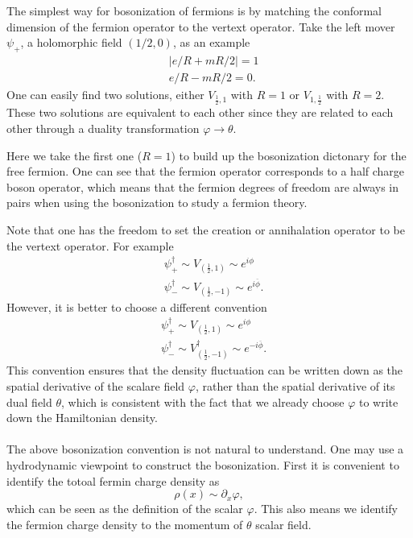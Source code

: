 The simplest way for bosonization of fermions is by matching the conformal dimension of the fermion operator to the vertext operator. Take the left mover $\psi_{+}$, a holomorphic field $\left(1/2,0\right)$, as an example
\begin{equation}
	\begin{aligned}
		&\left\vert e/R + mR/2 \right\vert = 1\\
		&e/R - mR/2 = 0.
	\end{aligned}
\end{equation}
One can easily find two solutions, either $V_{\frac{1}{2},1}$ with $R=1$ or $V_{1,\frac{1}{2}}$ with $R=2$. These two solutions are equivalent to each other since they are related to each other through a duality transformation $\varphi \rightarrow \theta$. 

Here we take the first one ($R=1$) to build up the bosonization dictonary for the free fermion. One can see that the fermion operator corresponds to a half charge boson operator, which means that the fermion degrees of freedom are always in pairs when using the bosonization to study a fermion theory.

Note that one has the freedom to set the creation or annihalation operator to be the vertext operator. For example
\begin{equation}
	\begin{aligned}
		&\psi^{\dagger}_{+} \sim V_{(\frac{1}{2},1)} \sim e^{i \phi} \\
		&{\psi}^{\dagger}_{-} \sim V_{(\frac{1}{2},-1)} \sim e^{i\overline{\phi}}.
	\end{aligned}
\end{equation}
However, it is better to choose a different convention
\begin{equation}
	\begin{aligned}
		&\psi^{\dagger}_{+} \sim V_{(\frac{1}{2},1)} \sim e^{i \phi} \\
		&{\psi}^{\dagger}_{-} \sim V_{(\frac{1}{2},-1)}^\dagger \sim e^{-i\overline{\phi}}.
	\end{aligned}
\end{equation}
This convention ensures that the density fluctuation can be written down as the spatial derivative of the scalare field $\varphi$, rather than the spatial derivative of its dual field $\theta$, which is consistent with the fact that we already choose $\varphi$ to write down the Hamiltonian density.\\

 \\
The above bosonization convention is not natural to understand. One may use a hydrodynamic viewpoint to construct the bosonization. First it is convenient to identify the totoal fermin charge density as 
\begin{equation}
	\rho(x) \sim \partial_x \varphi,
\end{equation}
which can be seen as the definition of the scalar $\varphi$. This also means we identify the fermion charge density to the momentum of $\theta$ scalar field. 

